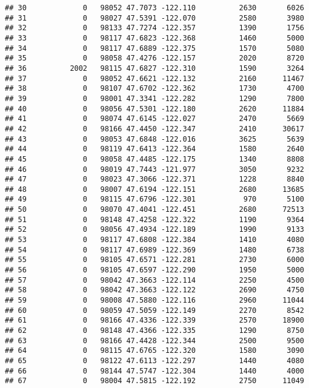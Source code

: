 \documentclass[
]{article}
\begin{document}
\begin{verbatim}
## 30             0   98052 47.7073 -122.110          2630       6026
## 31             0   98027 47.5391 -122.070          2580       3980
## 32             0   98133 47.7274 -122.357          1390       1756
## 33             0   98117 47.6823 -122.368          1460       5000
## 34             0   98117 47.6889 -122.375          1570       5080
## 35             0   98058 47.4276 -122.157          2020       8720
## 36          2002   98115 47.6827 -122.310          1590       3264
## 37             0   98052 47.6621 -122.132          2160      11467
## 38             0   98107 47.6702 -122.362          1730       4700
## 39             0   98001 47.3341 -122.282          1290       7800
## 40             0   98056 47.5301 -122.180          2620      11884
## 41             0   98074 47.6145 -122.027          2470       5669
## 42             0   98166 47.4450 -122.347          2410      30617
## 43             0   98053 47.6848 -122.016          3625       5639
## 44             0   98119 47.6413 -122.364          1580       2640
## 45             0   98058 47.4485 -122.175          1340       8808
## 46             0   98019 47.7443 -121.977          3050       9232
## 47             0   98023 47.3066 -122.371          1228       8840
## 48             0   98007 47.6194 -122.151          2680      13685
## 49             0   98115 47.6796 -122.301           970       5100
## 50             0   98070 47.4041 -122.451          2680      72513
## 51             0   98148 47.4258 -122.322          1190       9364
## 52             0   98056 47.4934 -122.189          1990       9133
## 53             0   98117 47.6808 -122.384          1410       4080
## 54             0   98117 47.6989 -122.369          1480       6738
## 55             0   98105 47.6571 -122.281          2730       6000
## 56             0   98105 47.6597 -122.290          1950       5000
## 57             0   98042 47.3663 -122.114          2250       4500
## 58             0   98042 47.3663 -122.122          2690       4750
## 59             0   98008 47.5880 -122.116          2960      11044
## 60             0   98059 47.5059 -122.149          2270       8542
## 61             0   98166 47.4336 -122.339          2570      18900
## 62             0   98148 47.4366 -122.335          1290       8750
## 63             0   98166 47.4428 -122.344          2500       9500
## 64             0   98115 47.6765 -122.320          1580       3090
## 65             0   98122 47.6113 -122.297          1440       4080
## 66             0   98144 47.5747 -122.304          1440       4000
## 67             0   98004 47.5815 -122.192          2750      11049

\end{verbatim}
\end{document}
